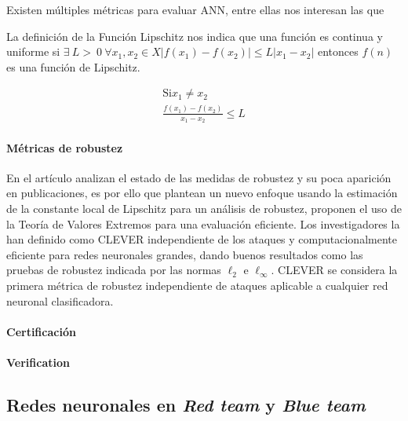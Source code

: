 Existen múltiples métricas para evaluar \acrshort{ANN}, entre ellas nos interesan las que

La definición de la Función Lipschitz nos indica que una función es continua y uniforme si ${\exists~L >~0~\forall x_{1}, x_{2} \in X \left\lvert f(x_{1})-f(x_{2}) \right\rvert \leq L \left\lvert x_{1} - x_{2}\right\rvert}$ entonces ${f(n)}$ es una función de Lipschitz.

\begin{equation}
    \begin{split}
        \text{Si} x_{1} \neq x_{2}                              \\
        \frac{ f(x_{1}) - f(x_{2}) }{ x_{1} - x_{2} } \leq L
    \end{split}
\end{equation}

\paragraph{Métricas de robustez}

En el artículo \cite{weng2018evaluating} analizan el estado de las medidas de robustez y su poca aparición en publicaciones, es por ello que plantean un nuevo enfoque usando la estimación de la constante local de Lipschitz para un análisis de robustez, proponen el uso de la Teoría de Valores Extremos para una evaluación eficiente. Los investigadores la han definido como \gls{CLEVER} independiente de los ataques y computacionalmente eficiente para redes neuronales grandes, dando buenos resultados como las pruebas de robustez indicada por las normas ${\ell_{2}}$ e ${\ell_{\infty}}$. \gls{CLEVER} se considera la primera métrica de robustez independiente de ataques aplicable a cualquier red neuronal clasificadora.



\paragraph{Certificación}

\paragraph{Verification}



\subsection{Redes neuronales en \textit{Red team} y \textit{Blue team}}

